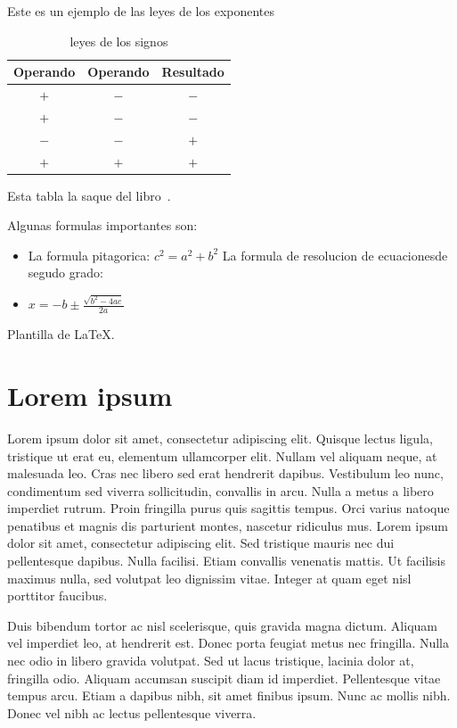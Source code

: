     
\begin{table}[h]
   Este es un ejemplo de las leyes de los exponentes\\
  \centering
  \begin{tabular}{| c | c | c | }
    \hline
    Operando & Operando & Resultado\\\hline
    $+$ & $-$ & $-$\\\hline
    $+$ & $-$ & $-$\\\hline
    $-$ & $-$ & $+$\\\hline
    $+$ & $+$ & $+$\\\hline
  \end{tabular}
  \caption{leyes de los signos}
  \label{tabla :leyes de los signos}
  \end{table}
Esta tabla la saque del libro~\cite{Floodlight}.




\newpage
Algunas formulas  importantes son:
\begin{itemize} 
\item La formula  pitagorica: $ c^2=a^2+b^2$  La formula de resolucion de ecuacionesde segudo grado:
\item $x=-b\pm\frac{\sqrt{b^2-4ac}}{2a}$
\end{itemize}



Plantilla de \LaTeX.\\

\section{Lorem ipsum}

Lorem ipsum dolor sit amet, consectetur adipiscing elit. Quisque lectus ligula,
tristique ut erat eu, elementum ullamcorper elit. Nullam vel aliquam neque, at
malesuada leo. Cras nec libero sed erat hendrerit dapibus. Vestibulum leo nunc,
condimentum sed viverra sollicitudin, convallis in arcu. Nulla a metus a libero
imperdiet rutrum. Proin fringilla purus quis sagittis tempus. Orci varius
natoque penatibus et magnis dis parturient montes, nascetur ridiculus mus. Lorem
ipsum dolor sit amet, consectetur adipiscing elit. Sed tristique mauris nec dui
pellentesque dapibus. Nulla facilisi. Etiam convallis venenatis mattis. Ut
facilisis maximus nulla, sed volutpat leo dignissim vitae. Integer at quam eget
nisl porttitor faucibus.

Duis bibendum tortor ac nisl scelerisque, quis gravida magna dictum. Aliquam vel
imperdiet leo, at hendrerit est. Donec porta feugiat metus nec fringilla. Nulla
nec odio in libero gravida volutpat. Sed ut lacus tristique, lacinia dolor at,
fringilla odio. Aliquam accumsan suscipit diam id imperdiet. Pellentesque vitae
tempus arcu. Etiam a dapibus nibh, sit amet finibus ipsum. Nunc ac mollis
nibh. Donec vel nibh ac lectus pellentesque viverra.

